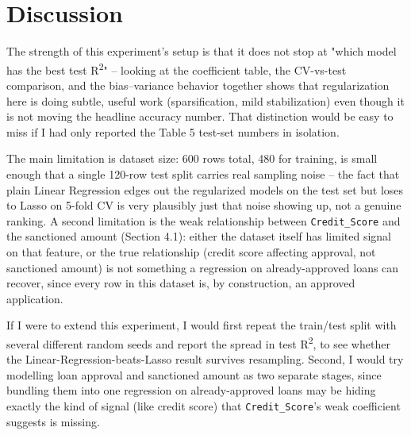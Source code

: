 \documentclass[11pt,a4paper]{article}
\begin{document}
\section{Discussion}
The strength of this experiment's setup is that it does not stop at "which model has the best test R\textsuperscript{2}" -- looking at the coefficient table, the CV-vs-test comparison, and the bias--variance behavior together shows that regularization here is doing subtle, useful work (sparsification, mild stabilization) even though it is not moving the headline accuracy number. That distinction would be easy to miss if I had only reported the Table 5 test-set numbers in isolation.

The main limitation is dataset size: 600 rows total, 480 for training, is small enough that a single 120-row test split carries real sampling noise -- the fact that plain Linear Regression edges out the regularized models on the test set but loses to Lasso on 5-fold CV is very plausibly just that noise showing up, not a genuine ranking. A second limitation is the weak relationship between \texttt{Credit\_Score} and the sanctioned amount (Section 4.1): either the dataset itself has limited signal on that feature, or the true relationship (credit score affecting approval, not sanctioned amount) is not something a regression on already-approved loans can recover, since every row in this dataset is, by construction, an approved application.

If I were to extend this experiment, I would first repeat the train/test split with several different random seeds and report the spread in test R\textsuperscript{2}, to see whether the Linear-Regression-beats-Lasso result survives resampling. Second, I would try modelling loan approval and sanctioned amount as two separate stages, since bundling them into one regression on already-approved loans may be hiding exactly the kind of signal (like credit score) that \texttt{Credit\_Score}'s weak coefficient suggests is missing.

\end{document}
